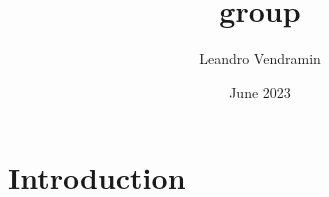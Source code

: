 \documentclass{article}
\title{group}
\author{Leandro Vendramin}
\date{June 2023}
\begin{document}
\maketitle

\section{Introduction}
\end{document}
